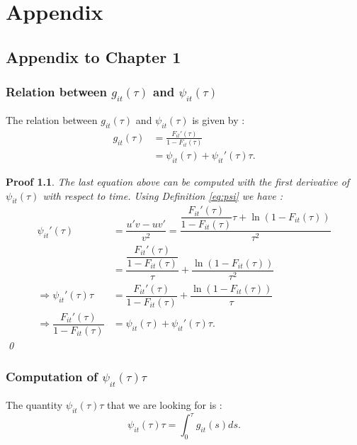 \appendix

\chapter{Appendix}

\section{Appendix to Chapter 1}
\label{appendix1}

\subsection{Relation between $g_{it}(\tau)$ and $\psi_{it}(\tau)$}

The relation between $g_{it}(\tau)$ and $\psi_{it}(\tau)$  is given by :
\begin{align} \label{gphi}
    g_{it}(\tau) &= \frac{F_{it}'(\tau)}{1-F_{it}(\tau)} \nonumber \\
    &= \psi_{it}(\tau) + \psi_{it}'(\tau)\tau.
\end{align}

\newtheorem*{proof1}{Proof}
\begin{proof1}
The last equation above can be computed with the first derivative of $\psi_{it}(\tau)$ with respect to time. Using Definition \ref{eq:psi} we have :
\begin{align*}
\psi_{it}'(\tau) &= \dfrac{u' v - u v'}{v^2} = \dfrac{\dfrac{F_{it}'(\tau)}{1-F_{it}(\tau)}\tau + \ln(1-F_{it}(\tau))}{\tau^2} \\
&= \dfrac{\dfrac{F_{it}'(\tau)}{1-F_{it}(\tau)}}{\tau} + \dfrac{\ln(1-F_{it}(\tau))}{\tau^2}\\
\Rightarrow \psi_{it}'(\tau) \tau &= \dfrac{F_{it}'(\tau)}{1-F_{it}(\tau)} + \dfrac{\ln(1-F_{it}(\tau))}{\tau}\\
\Rightarrow \dfrac{F_{it}'(\tau)}{1-F_{it}(\tau)} &= \psi_{it}(\tau) + \psi_{it}'(\tau) \tau.
\end{align*} \qed
\end{proof1}

\subsection{Computation of $\psi_{it}(\tau) \tau$}

The quantity $\psi_{it}(\tau) \tau$ that we are looking for is :
\begin{equation}
    \psi_{it}(\tau) \tau = \int_0^{\tau}g_{it}(s) ds.
\end{equation}


